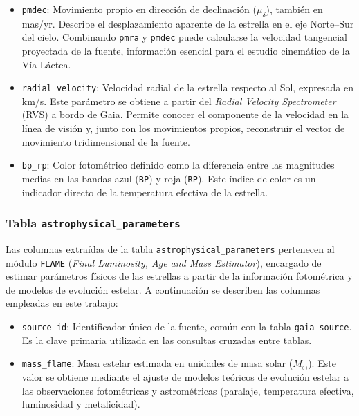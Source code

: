 \begin{itemize}
    \item \texttt{pmdec}: Movimiento propio en dirección de declinación ($\mu_{\delta}$), también en mas/yr.
    Describe el desplazamiento aparente de la estrella en el eje Norte–Sur del cielo.
    Combinando \texttt{pmra} y \texttt{pmdec} puede calcularse la velocidad tangencial proyectada de la fuente, información esencial para el estudio cinemático de la Vía Láctea.

    \item \texttt{radial\_velocity}: Velocidad radial de la estrella respecto al Sol, expresada en km/s.
    Este parámetro se obtiene a partir del \textit{Radial Velocity Spectrometer} (RVS) a bordo de Gaia.
    Permite conocer el componente de la velocidad en la línea de visión y, junto con los movimientos propios, reconstruir el vector de movimiento tridimensional de la fuente.

    \item \texttt{bp\_rp}: Color fotométrico definido como la diferencia entre las magnitudes medias en las bandas azul (\texttt{BP}) y roja (\texttt{RP}).
    Este índice de color es un indicador directo de la temperatura efectiva de la estrella.

\end{itemize}
\subsubsection{Tabla \texttt{astrophysical\_parameters}}
Las columnas extraídas de la tabla \texttt{astrophysical\_parameters} pertenecen al módulo \texttt{FLAME} (\textit{Final Luminosity, Age and Mass Estimator}), encargado de estimar parámetros físicos de las estrellas a partir de la información fotométrica y de modelos de evolución estelar.
A continuación se describen las columnas empleadas en este trabajo:

\begin{itemize}
    \item \texttt{source\_id}: Identificador único de la fuente, común con la tabla \texttt{gaia\_source}.
    Es la clave primaria utilizada en las consultas cruzadas entre tablas.

    \item \texttt{mass\_flame}: Masa estelar estimada en unidades de masa solar ($M_{\odot}$). Este valor se obtiene mediante el ajuste de modelos teóricos de evolución estelar a las observaciones fotométricas y astrométricas (paralaje, temperatura efectiva, luminosidad y metalicidad).

\end{itemize}
